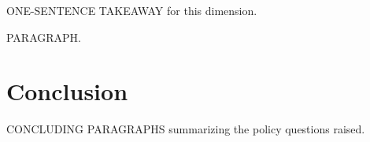 \documentclass[acmlarge,nonacm,natbib=false]{acmart}
\begin{document}
\begin{techbriefbody}
\begin{takeaway}
ONE-SENTENCE TAKEAWAY for this dimension.
\end{takeaway}

 PARAGRAPH.

\section*{Conclusion}

CONCLUDING PARAGRAPHS summarizing the policy questions raised.
\end{techbriefbody}

\techbriefbackpage
\printbibliography
\end{document}
